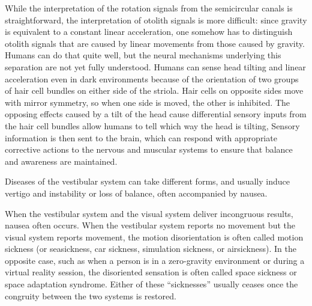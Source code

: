While the interpretation of the rotation signals from the semicircular
canals is straightforward, the interpretation of otolith signals is more
difficult: since gravity is equivalent to a constant linear
acceleration, one somehow has to distinguish otolith signals that are
caused by linear movements from those caused by gravity. Humans can do
that quite well, but the neural mechanisms underlying this separation
are not yet fully understood. Humans can sense head tilting and linear
acceleration even in dark environments because of the orientation of two
groups of hair cell bundles on either side of the striola. Hair cells on
opposite sides move with mirror symmetry, so when one side is moved, the
other is inhibited. The opposing effects caused by a tilt of the head
cause differential sensory inputs from the hair cell bundles allow
humans to tell which way the head is tilting, Sensory information is
then sent to the brain, which can respond with appropriate corrective
actions to the nervous and muscular systems to ensure that balance and
awareness are maintained.

Diseases of the vestibular system can take different forms, and usually
induce vertigo and instability or loss of balance, often accompanied by
nausea.

When the vestibular system and the visual system deliver incongruous
results, nausea often occurs. When the vestibular system reports no
movement but the visual system reports movement, the motion
disorientation is often called motion sickness (or seasickness, car
sickness, simulation sickness, or airsickness). In the opposite case,
such as when a person is in a zero-gravity environment or during a
virtual reality session, the disoriented sensation is often called space
sickness or space adaptation syndrome. Either of these ``sicknesses''
usually ceases once the congruity between the two systems is restored.

